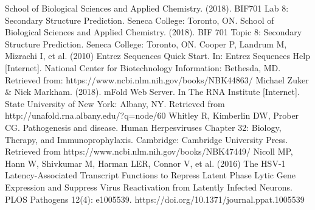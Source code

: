 \documentclass[letterpaper, 10 pt, conference]{ieeeconf}  %
\begin{document}

\begin{thebibliography}{99}

 School of Biological Sciences and Applied Chemistry. (2018). BIF701 Lab 8: Secondary Structure Prediction. Seneca College: Toronto, ON.
 School of Biological Sciences and Applied Chemistry. (2018). BIF 701 Topic 8: Secondary Structure Prediction. Seneca College: Toronto, ON. 
 Cooper P, Landrum M, Mizrachi I, et al. (2010) Entrez Sequences Quick Start. In: Entrez Sequences Help [Internet]. National Center for Biotechnology Information: Bethesda, MD. Retrieved from: https://www.ncbi.nlm.nih.gov/books/NBK44863/
 Michael Zuker \& Nick Markham. (2018). mFold Web Server. In The RNA Institute [Internet]. State University of New York: Albany, NY. Retrieved from http://unafold.rna.albany.edu/?q=node/60
 Whitley R, Kimberlin DW, Prober CG. Pathogenesis and disease. Human Herpesviruses Chapter 32: Biology, Therapy, and Immunoprophylaxis. Cambridge: Cambridge University Press. Retrieved from https://www.ncbi.nlm.nih.gov/books/NBK47449/
Nicoll MP, Hann W, Shivkumar M, Harman LER, Connor V, et al. (2016) The HSV-1 Latency-Associated Transcript Functions to Repress Latent Phase Lytic Gene Expression and Suppress Virus Reactivation from Latently Infected Neurons. PLOS Pathogens 12(4): e1005539. https://doi.org/10.1371/journal.ppat.1005539

\end{thebibliography}
\end{document}
